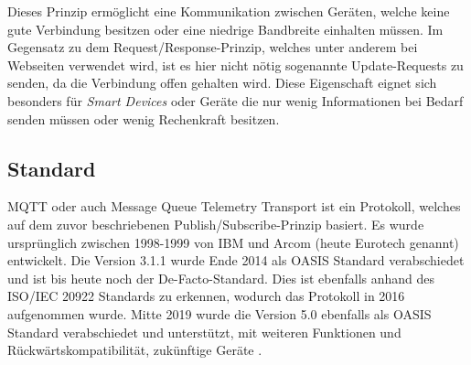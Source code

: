     Dieses Prinzip ermöglicht eine Kommunikation zwischen Geräten, welche keine gute Verbindung besitzen oder eine niedrige Bandbreite einhalten müssen. Im Gegensatz zu dem Request/Response-Prinzip, welches unter anderem bei Webseiten verwendet wird, ist es hier nicht nötig sogenannte \glqq Update-Requests\grqq{} zu senden, da die Verbindung offen gehalten wird.
    Diese Eigenschaft eignet sich besonders für \emph{Smart Devices} oder Geräte die nur wenig Informationen bei Bedarf senden müssen oder wenig Rechenkraft besitzen.

    \subsection{Standard}
        \ac{MQTT} oder auch Message Queue Telemetry Transport ist ein Protokoll, welches auf dem zuvor beschriebenen Publish/Subscribe-Prinzip basiert. Es wurde ursprünglich zwischen 1998-1999 von IBM und Arcom (heute Eurotech genannt) entwickelt. Die Version 3.1.1 wurde Ende 2014 als OASIS Standard verabschiedet und ist bis heute noch der De-Facto-Standard. Dies ist ebenfalls anhand des ISO/IEC 20922 Standards zu erkennen, wodurch das Protokoll in 2016 aufgenommen wurde. \cite{eclipse_foundation2017} Mitte 2019 wurde die Version 5.0 ebenfalls als OASIS Standard verabschiedet und unterstützt, mit weiteren Funktionen und Rückwärtskompatibilität, zukünftige Geräte \cite{mqtt_org_2019}.
        
